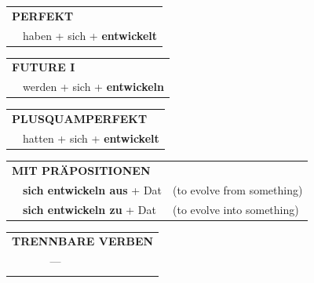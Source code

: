 \documentclass[10pt,a4paper]{revtex4-2}
\begin{document}
\begin{verbbox}
 \begin{tabular}{rl}
     \multicolumn{2}{l}{\textbf{PERFEKT}}\\
    &haben + sich + \textbf{entwickelt}\\
  \end{tabular}
\hfill
   \begin{tabular}{rl}
   
    \multicolumn{2}{l}{\textbf{FUTURE I} }\\
    &werden + sich + \textbf{entwickeln}\\
 
  \end{tabular}
\hfill
   \begin{tabular}{rl}
      \multicolumn{2}{l}{\textbf{PLUSQUAMPERFEKT}}\\
    &hatten + sich + \textbf{entwickelt}\\
  \end{tabular}
  
\vspace{10pt}

   \begin{tabular}{lll}
      \multicolumn{3}{l}{\textbf{MIT PRÄPOSITIONEN}}\\
& \textbf{sich entwickeln aus} + Dat & (to evolve from something)\\
& \textbf{sich entwickeln zu} + Dat & (to evolve into something)
  \end{tabular}
  \hfill
   \begin{tabular}{lll}
      \multicolumn{3}{l}{\textbf{TRENNBARE VERBEN}}\\
      & --- &\\
\vspace{10pt}
  \end{tabular}
  
  \vspace{-5pt}

\end{verbbox}
\end{document}
